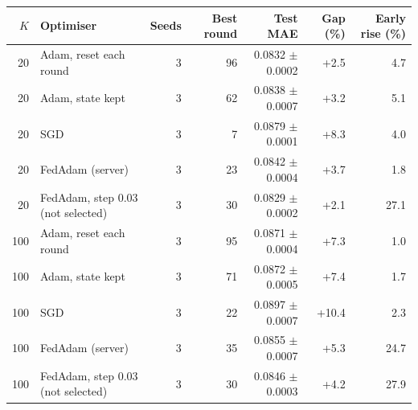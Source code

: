 \begin{tabular}{rlrrrrr}
\toprule
$K$ & Optimiser & Seeds & Best round & Test MAE & Gap (\%) & Early rise (\%) \\
\midrule
20 & Adam, reset each round & 3 & 96 & 0.0832 $\pm$ 0.0002 & +2.5 & 4.7 \\
20 & Adam, state kept & 3 & 62 & 0.0838 $\pm$ 0.0007 & +3.2 & 5.1 \\
20 & SGD & 3 & 7 & 0.0879 $\pm$ 0.0001 & +8.3 & 4.0 \\
20 & FedAdam (server) & 3 & 23 & 0.0842 $\pm$ 0.0004 & +3.7 & 1.8 \\
20 & FedAdam, step 0.03 (not selected) & 3 & 30 & 0.0829 $\pm$ 0.0002 & +2.1 & 27.1 \\
100 & Adam, reset each round & 3 & 95 & 0.0871 $\pm$ 0.0004 & +7.3 & 1.0 \\
100 & Adam, state kept & 3 & 71 & 0.0872 $\pm$ 0.0005 & +7.4 & 1.7 \\
100 & SGD & 3 & 22 & 0.0897 $\pm$ 0.0007 & +10.4 & 2.3 \\
100 & FedAdam (server) & 3 & 35 & 0.0855 $\pm$ 0.0007 & +5.3 & 24.7 \\
100 & FedAdam, step 0.03 (not selected) & 3 & 30 & 0.0846 $\pm$ 0.0003 & +4.2 & 27.9 \\
\bottomrule
\end{tabular}
